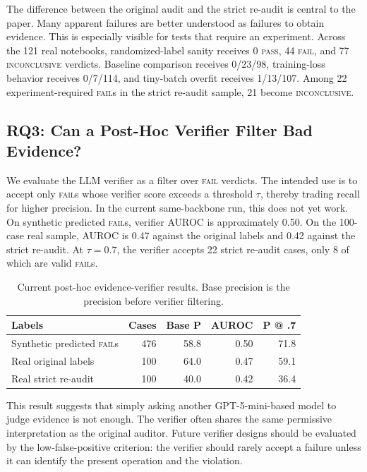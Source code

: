 \documentclass[11pt]{article}
\begin{document}
The difference between the original audit and the strict re-audit is central to the paper.
Many apparent failures are better understood as failures to obtain evidence.
This is especially visible for tests that require an experiment.
Across the 121 real notebooks, randomized-label sanity receives 0 \textsc{pass}, 44 \textsc{fail}, and 77 \textsc{inconclusive} verdicts.
Baseline comparison receives 0/23/98, training-loss behavior receives 0/7/114, and tiny-batch overfit receives 1/13/107.
Among 22 experiment-required \textsc{fail}s in the strict re-audit sample, 21 become \textsc{inconclusive}.

\subsection{RQ3: Can a Post-Hoc Verifier Filter Bad Evidence?}

We evaluate the LLM verifier as a filter over \textsc{fail} verdicts.
The intended use is to accept only \textsc{fail}s whose verifier score exceeds a threshold $\tau$, thereby trading recall for higher precision.
In the current same-backbone run, this does not yet work.
On synthetic predicted \textsc{fail}s, verifier AUROC is approximately 0.50.
On the 100-case real sample, AUROC is 0.47 against the original labels and 0.42 against the strict re-audit.
At $\tau = 0.7$, the verifier accepts 22 strict re-audit cases, only 8 of which are valid \textsc{fail}s.

\begin{table}[t]
  \centering
  \small
  \caption{Current post-hoc evidence-verifier results. Base precision is the precision before verifier filtering.}
  \label{tab:verifier}
  \begin{tabular}{lrrrr}
    \toprule
    Labels & Cases & Base P & AUROC & P @ .7 \\
    \midrule
    Synthetic predicted \textsc{fail}s & 476 & 58.8 & 0.50 & 71.8 \\
    Real original labels & 100 & 64.0 & 0.47 & 59.1 \\
    Real strict re-audit & 100 & 40.0 & 0.42 & 36.4 \\
    \bottomrule
  \end{tabular}
\end{table}

This result suggests that simply asking another GPT-5-mini-based model to judge evidence is not enough.
The verifier often shares the same permissive interpretation as the original auditor.
Future verifier designs should be evaluated by the low-false-positive criterion: the verifier should rarely accept a failure unless it can identify the present operation and the violation.
\end{document}
